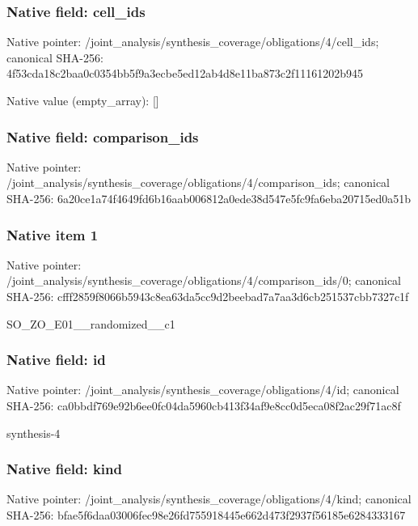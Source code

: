 \documentclass[10pt,a4paper]{article}
\begin{document}
\subsubsection{Native field: cell\_\allowbreak{}ids}
Native pointer: /joint\_\allowbreak{}analysis/synthesis\_\allowbreak{}coverage/obligations/4/cell\_\allowbreak{}ids; canonical SHA-256: 4f53cda18c2baa0c0354bb5f9a3ecbe5ed12ab4d8e11ba873c2f11161202b945

Native value (empty\_\allowbreak{}array): []

\subsubsection{Native field: comparison\_\allowbreak{}ids}
Native pointer: /joint\_\allowbreak{}analysis/synthesis\_\allowbreak{}coverage/obligations/4/comparison\_\allowbreak{}ids; canonical SHA-256: 6a20ce1a74f4649fd6b16aab006812a0ede38d547e5fc9fa6eba20715ed0a51b

\subsubsection{Native item 1}
Native pointer: /joint\_\allowbreak{}analysis/synthesis\_\allowbreak{}coverage/obligations/4/comparison\_\allowbreak{}ids/0; canonical SHA-256: cfff2859f8066b5943c8ea63da5cc9d2beebad7a7aa3d6cb251537cbb7327c1f

\begingroup\raggedright\sloppy SO\_\allowbreak{}ZO\_\allowbreak{}E01\_\allowbreak{}\_\allowbreak{}randomized\_\allowbreak{}\_\allowbreak{}c1\par\endgroup

\subsubsection{Native field: id}
Native pointer: /joint\_\allowbreak{}analysis/synthesis\_\allowbreak{}coverage/obligations/4/id; canonical SHA-256: ca0bbdf769e92b6ee0fc04da5960cb413f34af9e8cc0d5eca08f2ac29f71ac8f

\begingroup\raggedright\sloppy synthesis-4\par\endgroup

\subsubsection{Native field: kind}
Native pointer: /joint\_\allowbreak{}analysis/synthesis\_\allowbreak{}coverage/obligations/4/kind; canonical SHA-256: bfae5f6daa03006fec98e26fd755918445e662d473f2937f56185e6284333167
\end{document}
